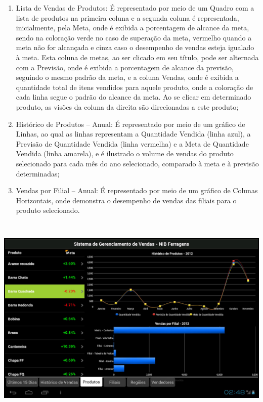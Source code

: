 \documentclass[a4paper]{article}
\newcommand\liststyleWWviiiNumxxxvii{%
\renewcommand\theenumi{\alph{enumi}}
\renewcommand\theenumii{\alph{enumii}}
\renewcommand\theenumiii{\roman{enumiii}}
\renewcommand\theenumiv{\arabic{enumiv}}
\renewcommand\labelenumi{\theenumi)}
\renewcommand\labelenumii{\theenumii.}
\renewcommand\labelenumiii{\theenumiii.}
\renewcommand\labelenumiv{\theenumiv.}
}
\begin{document}
\liststyleWWviiiNumxxxvii
\begin{enumerate}
\item {
\textsf{Lista de Vendas de Produtos: \'E representado por meio de um Quadro com a lista de produtos na primeira coluna e
a segunda coluna \'e representada, inicialmente, pela Meta, onde \'e exibida a porcentagem de alcance da meta, sendo na
colora\c{c}\~ao verde no caso de supera\c{c}\~ao da meta, vermelho quando a meta n\~ao for alcan\c{c}ada e cinza caso o
desempenho de vendas esteja igualado \`a meta. Esta coluna de metas, ao ser clicado em seu t\'itulo, pode ser alternada
com a Previs\~ao, onde \'e exibida a porcentagem de alcance da previs\~ao, seguindo o mesmo padr\~ao da meta, e a
coluna Vendas, onde \'e exibida a quantidade total de itens vendidos para aquele produto, onde a colora\c{c}\~ao de
cada linha segue o padr\~ao do alcance da meta. Ao se clicar em determinado produto, as vis\~oes da coluna da direita
s\~ao direcionadas a este produto;}}
\item {
\textsf{Hist\'orico de Produtos -- Anual: \'E representado por meio de um gr\'afico de Linhas, ao qual as linhas
representam a Quantidade Vendida (linha azul), a Previs\~ao de Quantidade Vendida (linha vermelha) e a Meta de
Quantidade Vendida (linha amarela), e \'e ilustrado o volume de vendas do produto selecionado para cada m\^es do ano
selecionado, comparado \`a meta e \`a previs\~ao determinadas;}}
\item {\sffamily
Vendas por Filial -- Anual: \'E representado por meio de um gr\'afico de Colunas Horizontais, onde demonstra o
desempenho de vendas das filiais para o produto selecionado.}
\end{enumerate}
 \includegraphics[width=15.972cm,height=10.029cm]{monograph-img022.jpg} 
\end{document}
